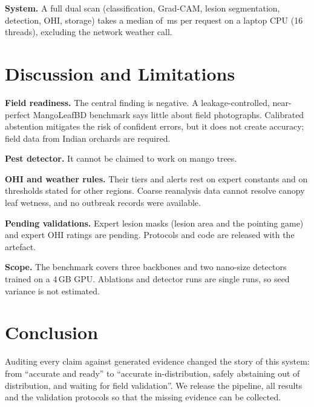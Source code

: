 \documentclass[conference]{IEEEtran}
\begin{document}
\textbf{System.} A full dual scan (classification, Grad-CAM, lesion segmentation, detection, OHI, storage) takes a
median of \apiDualMs{}\,ms per request on a laptop CPU (16 threads), excluding the network weather call.

\section{Discussion and Limitations}
\textbf{Field readiness.} The central finding is negative. A leakage-controlled, near-perfect MangoLeafBD
benchmark says little about field photographs. Calibrated abstention mitigates the risk of confident errors, but it
does not create accuracy; field data from Indian orchards are required.

\textbf{Pest detector.} It cannot be claimed to work on mango trees.

\textbf{OHI and weather rules.} Their tiers and alerts rest on expert constants and on thresholds stated for other
regions. Coarse reanalysis data cannot resolve canopy leaf wetness, and no outbreak records were available.

\textbf{Pending validations.} Expert lesion masks (lesion area and the pointing game) and expert OHI ratings are
pending. Protocols and code are released with the artefact.

\textbf{Scope.} The benchmark covers three backbones and two nano-size detectors trained on a 4\,GB GPU.
Ablations and detector runs are single runs, so seed variance is not estimated.

\section{Conclusion}
Auditing every claim against generated evidence changed the story of this system: from ``accurate and ready'' to
``accurate in-distribution, safely abstaining out of distribution, and waiting for field validation''. We release
the pipeline, all results and the validation protocols so that the missing evidence can be collected.



\end{document}
